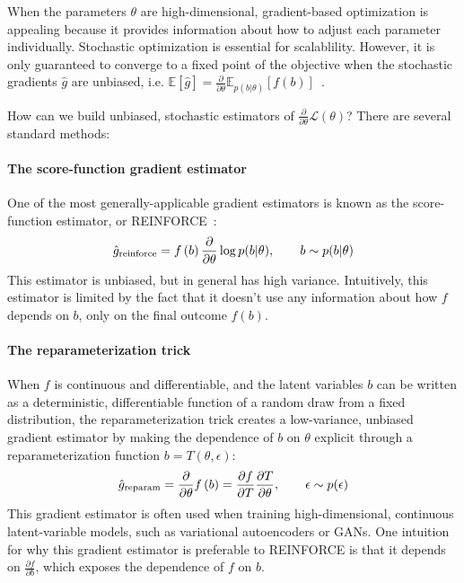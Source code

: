 \documentclass{article}
\newcommand{\PT}{\frac{\partial}{\partial \theta}}
\begin{document}
When the parameters $\theta$ are high-dimensional, gradient-based optimization is appealing because it provides information about how to adjust each parameter individually.
Stochastic optimization is essential for scalablility.
However, it is only guaranteed to converge to a fixed point of the objective when the stochastic gradients $\hat g$ are unbiased, i.e. ${\mathbb{E} \left[ \hat g \right] = \PT \mathbb{E}_{p(b|\theta)} \left[ f(b) \right]}$~\citep{robbins1951stochastic}.

How can we build unbiased, stochastic estimators of $\PT \mathcal{L}(\theta)$?
There are several standard methods:

\paragraph{The score-function gradient estimator}
One of the most generally-applicable gradient estimators is known as the score-function estimator, or REINFORCE~\citep{williams1992simple}:
%
\begin{align}
\hat g_\textnormal{reinforce} =  f \left( b \right) \PT \log p(b | \theta), \qquad b \sim p(b | \theta)
\end{align}
%
This estimator is unbiased, but in general has high variance.
Intuitively, this estimator is limited by the fact that it doesn't use any information about how $f$ depends on $b$, only on the final outcome $f(b)$.

\paragraph{The reparameterization trick}
When $f$ is continuous and differentiable, and the latent variables $b$ can be written as a deterministic, differentiable function of a random draw from a fixed distribution, the reparameterization trick \citep{williams1992simple, kingma2013autoencoding, rezende2014stochastic} creates a low-variance, unbiased gradient estimator by making the dependence of $b$ on $\theta$ explicit through a reparameterization function $b=T(\theta, \epsilon)$:
%
\begin{align}
\hat g_\textnormal{reparam}
= \PT f \left( b \right)
= \frac{\partial f}{\partial T}\frac{\partial T}{\partial \theta} , 
\qquad \epsilon \sim p(\epsilon) 
\end{align}
%
This gradient estimator is often used when training high-dimensional, continuous latent-variable models, such as variational autoencoders or GANs.
One intuition for why this gradient estimator is preferable to REINFORCE is that it depends on $\frac{\partial f}{\partial b}$, which exposes the dependence of $f$ on $b$.
\end{document}
